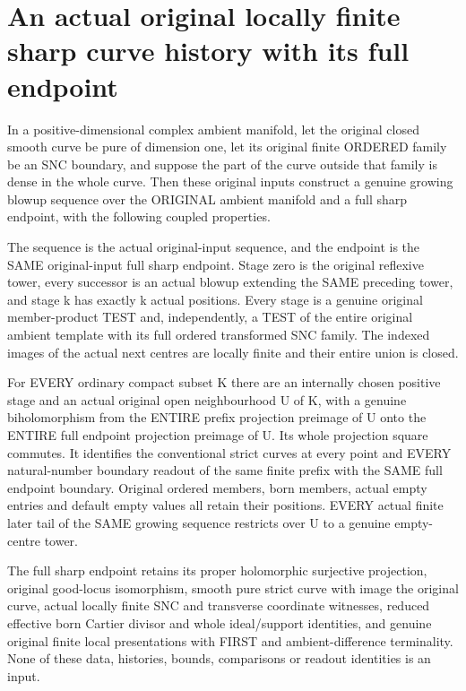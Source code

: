 \section{An actual original locally finite sharp curve history with its full endpoint}

\begin{theorem}
\label{hir:sharp-actual-original-locally-finite-sharp-history-existence}
\leanok
In a positive-dimensional complex ambient manifold, let the original
closed smooth curve be pure of dimension one, let its original finite
ORDERED family be an SNC boundary, and suppose the part of the curve
outside that family is dense in the whole curve. Then these original
inputs construct a genuine growing blowup sequence over the ORIGINAL
ambient manifold and a full sharp endpoint, with the following coupled
properties.

The sequence is the actual original-input sequence, and the endpoint is
the SAME original-input full sharp endpoint. Stage zero is the original
reflexive tower, every successor is an actual blowup extending the SAME
preceding tower, and stage k has exactly k actual positions. Every stage
is a genuine original member-product TEST and, independently, a TEST of
the entire original ambient template with its full ordered transformed
SNC family. The indexed images of the actual next centres are locally
finite and their entire union is closed.

For EVERY ordinary compact subset K there are an internally chosen
positive stage and an actual original open neighbourhood U of K, with a
genuine biholomorphism from the ENTIRE prefix projection preimage of U
onto the ENTIRE full endpoint projection preimage of U. Its whole
projection square commutes. It identifies the conventional strict curves
at every point and EVERY natural-number boundary readout of the same
finite prefix with the SAME full endpoint boundary. Original ordered
members, born members, actual empty entries and default empty values all
retain their positions. EVERY actual finite later tail of the SAME
growing sequence restricts over U to a genuine empty-centre tower.

The full sharp endpoint retains its proper holomorphic surjective
projection, original good-locus isomorphism, smooth pure strict curve with
image the original curve, actual locally finite SNC and transverse
coordinate witnesses, reduced effective born Cartier divisor and whole
ideal/support identities, and genuine original finite local presentations
with FIRST and ambient-difference terminality. None of these data,
histories, bounds, comparisons or readout identities is an input.
\end{theorem}
